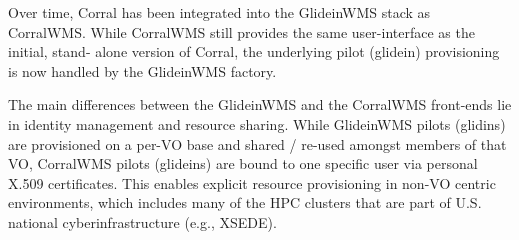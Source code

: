 \documentclass{sig-alternate}
\begin{document}
Over time, Corral has been integrated into the GlideinWMS stack as CorralWMS.
While CorralWMS still provides the same user-interface as the initial, stand-
alone version of Corral, the underlying pilot (glidein) provisioning is
now handled by the GlideinWMS factory.

The main differences between the GlideinWMS and the CorralWMS front-ends lie in
identity management and resource sharing. While GlideinWMS pilots (glidins) are
provisioned on a per-VO base and shared / re-used amongst members of that VO,
CorralWMS pilots (glideins) are bound to one specific user via personal  X.509
certificates. This enables explicit resource provisioning in non-VO centric
environments, which includes many of the HPC clusters that are part of U.S.
national cyberinfrastructure (e.g., XSEDE).


%

\end{document}
